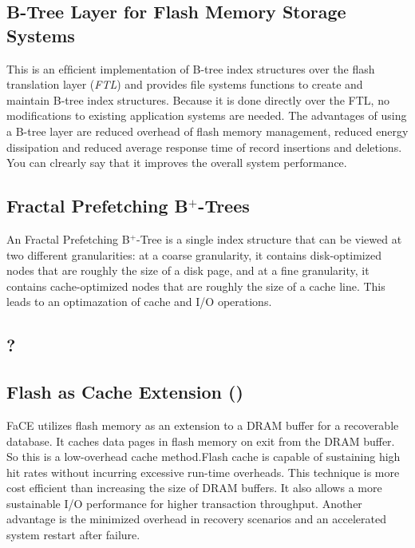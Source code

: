 \documentclass{acm_proc_article-sp}
\begin{document}
\subsection{B-Tree Layer for Flash Memory Storage Systems}
This is an efﬁcient implementation of B-tree index structures over the flash translation layer (\emph{FTL}) and provides ﬁle systems functions to create and maintain B-tree index structures. Because it is done directly over the FTL, no modiﬁcations to existing application systems are needed. The advantages of using a B-tree layer are reduced overhead of flash memory management, reduced energy dissipation and reduced average response time of record insertions and deletions. You can clrearly say that it improves the overall system performance. %

\cite{wu2007efficient}

\subsection{Fractal Prefetching B$^{+}$-Trees}
An Fractal Prefetching B$^{+}$-Tree is a single index structure that can be viewed at two different granularities: at a coarse granularity, it contains disk-optimized nodes that are roughly the size of a disk page, and at a fine granularity, it contains cache-optimized nodes that are roughly the size of a cache line. This leads to an optimazation of cache and I/O operations. %

\cite{chen2002fractal}

\subsection{?} %

\subsection{Flash as Cache Extension ()}
FaCE utilizes ﬂash memory as an extension to a DRAM buffer for a recoverable database. It caches data pages in ﬂash memory on exit from the DRAM buffer. So this is a low-overhead cache method.Flash cache is capable of sustaining high hit rates without incurring excessive run-time overheads. This technique is more cost efficient than increasing the size of DRAM buffers. It also allows a more sustainable I/O performance for higher transaction throughput. Another advantage is the minimized overhead in recovery scenarios and an accelerated system restart after failure. %
\end{document}
